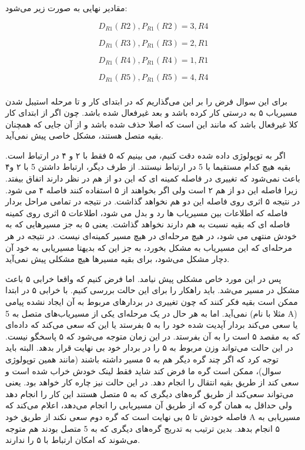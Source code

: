 \documentclass[12pt]{article}
\begin{document}
مقادیر نهایی به صورت زیر می‌شود:

$$D_{R1}(R2) , P_{R1}(R2) = 3 , R4$$


$$D_{R1}(R3) , P_{R1}(R3) = 2 , R1$$


$$D_{R1}(R4) , P_{R1}(R4) = 1 , R1$$


$$D_{R1}(R5) , P_{R1}(R5) = 4 , R4$$



\subsubsection{}

برای این سوال فرض را بر این می‌گذاریم که در ابتدای کار و تا مرحله استیبل شدن مسیریاب ۵ به درستی 
کار کرده باشد و بعد غیرفعال شده باشد. چون اگر از ابتدای کار کلا غیرفعال باشد که مانند این است که اصلا حذف شده باشد و از آن جایی که همچنان بقیه متصل هستند، مشکل خاصی پیش نمی‌آید.

اگر به توپولوژی داده شده دقت کنیم، می بینیم که ۵ فقط با ۲ و ۴ در ارتباط است. بقیه هیچ کدام مستقیما با 5 در ارتباط نیستند. از طرف دیگر، ارتباط داشتن 5 با ۲ و۴ باعث نمی‌شود که تغییری در فاصله کمینه ای که این دو از هم در نظر دارند اتفاق بیفتد. زیرا فاصله این دو از هم ۲ است ولی اگر بخواهند از ۵ استفاده کنند فاصله ۴ می شود. در نتیجه ۵ اثری روی فاصله این دو هم نخواهد گذاشت. در نتیجه در تمامی مراحل بردار فاصله که اطلاعات بین مسیریاب ها رد و بدل می شود، اطلاعات ۵ اثری روی کمینه فاصله ای که بقیه نسبت به هم دارند نخواهد گذاشت. یعنی ۵ به جز مسیرهایی که به خودش منتهی می شود، در هیچ مرحله‌ای در هیچ مسیر کمینه‌ای نیست. در نتیجه در هر مرحله‌ای که این مسیریاب به مشکل بخورد، به جز این که بدیهتا مسیریابی به خود آن دچار مشکل می‌شود، برای بقیه مسیرها هیچ مشکلی پیش نمی‌آید.


پس در این مورد خاص مشکلی پیش نیامد. اما فرض کنیم که واقعا خرابی ۵ باعث مشکل در مسیر می‌شد. باید راهکار را برای این حالت بررسی کنیم. با خرابی ۵ در ابتدا ممکن است بقیه فکر کنند که چون تغییری در بردارهای مربوط به آن ایجاد نشده پیامی نمی‌آید. اما به هر حال  در یک مرحله‌ای یکی از مسیریاب‌های متصل به 5 (مثلا با نام A) یا سعی‌ می‌کند بردار آپدیت شده خود را به ۵ بفرستد یا این که سعی می‌کند که داده‌ای که به مقصد ۵ است را به آن بفرستد. در این زمان متوجه می‌شود که ۵ پاسخگو نیست. در این حالت می‌تواند وزن مربوط به ۵ را در بردار خود بی نهایت قرار بدهد. البته باید توجه کرد که اگر چند گره دیگر هم به ۵ مسیر داشته باشند (مانند همین توپولوژی سوال)، ممکن است گره ما فرض کند شاید فقط لینک خودش خراب شده است و سعی کند از طریق بقیه انتقال را انجام دهد. در این حالت نیز  چاره کار خواهد بود. یعنی می‌تواند سعی‌کند از طریق گره‌های دیگری که به ۵ متصل هستند این کار را انجام دهد ولی حداقل به همان گره‌ که از طریق آن مسیریابی را انجام می‌دهد، اعلام می‌کند که فاصله خودش تا ۵ بی نهایت است که گره دوم سعی نکند از طریق خود A مسیریابی به ۵ انجام بدهد. بدین ترتیب به تدریج گره‌های دیگری که به 5 متصل بودند هم متوجه می‌شوند که امکان ارتباط با ۵ را ندارند. 
\end{document}
